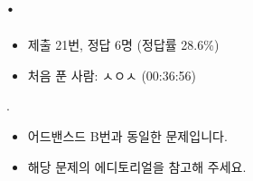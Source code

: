 
\section{\texorpdfstring{\pletter. \ptitle}{문제 \pletter}}

\begin{frame}[label=problem-L]
    \sectiontitle{\pletter}{\ptitle}
    \begin{itemize}
        \item 제출 21번, 정답 6명 (정답률 28.6\%)
        \item 처음 푼 사람: ㅅㅇㅅ (00:36:56)
    \end{itemize}
\end{frame}

\begin{frame}{\textbf{\pletter}. \ptitle}
\begin{itemize}
        \item 어드밴스드 B번과 동일한 문제입니다.
        \item 해당 문제의 에디토리얼을 참고해 주세요.
    \end{itemize}
    \begin{center}
    \end{center}
\end{frame}
